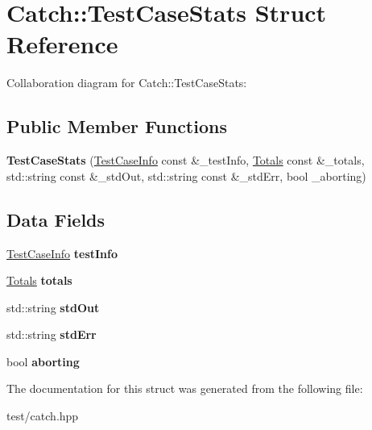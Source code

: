\hypertarget{structCatch_1_1TestCaseStats}{}\section{Catch\+:\+:Test\+Case\+Stats Struct Reference}
\label{structCatch_1_1TestCaseStats}


Collaboration diagram for Catch\+:\+:Test\+Case\+Stats\+:
\subsection*{Public Member Functions}
\begin{DoxyCompactItemize}
\item 
{\bfseries Test\+Case\+Stats} (\hyperlink{structCatch_1_1TestCaseInfo}{Test\+Case\+Info} const \&\+\_\+test\+Info, \hyperlink{structCatch_1_1Totals}{Totals} const \&\+\_\+totals, std\+::string const \&\+\_\+std\+Out, std\+::string const \&\+\_\+std\+Err, bool \+\_\+aborting)\hypertarget{structCatch_1_1TestCaseStats_ac5000f8751634dc39e48b87bd7e79970}{}\label{structCatch_1_1TestCaseStats_ac5000f8751634dc39e48b87bd7e79970}

\end{DoxyCompactItemize}
\subsection*{Data Fields}
\begin{DoxyCompactItemize}
\item 
\hyperlink{structCatch_1_1TestCaseInfo}{Test\+Case\+Info} {\bfseries test\+Info}\hypertarget{structCatch_1_1TestCaseStats_a6eb1ba3f940b899f7734c0f8888c0252}{}\label{structCatch_1_1TestCaseStats_a6eb1ba3f940b899f7734c0f8888c0252}

\item 
\hyperlink{structCatch_1_1Totals}{Totals} {\bfseries totals}\hypertarget{structCatch_1_1TestCaseStats_afc3947e6c6ca93cad0bdc6742c65c4a8}{}\label{structCatch_1_1TestCaseStats_afc3947e6c6ca93cad0bdc6742c65c4a8}

\item 
std\+::string {\bfseries std\+Out}\hypertarget{structCatch_1_1TestCaseStats_acab436aeefce581c52d0e195872484f7}{}\label{structCatch_1_1TestCaseStats_acab436aeefce581c52d0e195872484f7}

\item 
std\+::string {\bfseries std\+Err}\hypertarget{structCatch_1_1TestCaseStats_a84851abaa94a6b09664517a4919fa8ac}{}\label{structCatch_1_1TestCaseStats_a84851abaa94a6b09664517a4919fa8ac}

\item 
bool {\bfseries aborting}\hypertarget{structCatch_1_1TestCaseStats_a0b61bf85883cde3d2c294a685aed49e7}{}\label{structCatch_1_1TestCaseStats_a0b61bf85883cde3d2c294a685aed49e7}

\end{DoxyCompactItemize}


The documentation for this struct was generated from the following file\+:\begin{DoxyCompactItemize}
\item 
test/catch.\+hpp\end{DoxyCompactItemize}

